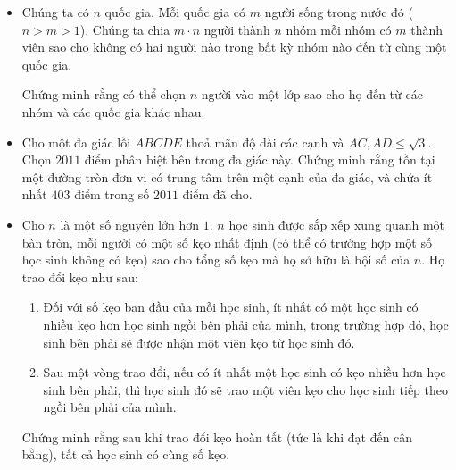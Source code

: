 \documentclass[11pt]{scrartcl}
\begin{document}
\begin{itemize}[label=, leftmargin=0em, itemsep=0.5em]
    \item \begin{btvn}
        Chúng ta có $n$ quốc gia. Mỗi quốc gia có $m$ người sống trong nước đó ($n>m>1$). Chúng ta chia $m \cdot n$ người thành $n$ nhóm mỗi nhóm có $m$ thành viên sao cho không có hai người nào trong bất kỳ nhóm nào đến từ cùng một quốc gia.


        Chứng minh rằng có thể chọn $n$ người vào một lớp sao cho họ đến từ các nhóm và các quốc gia khác nhau.
    \end{btvn}

    \item \begin{btvn}
        Cho một đa giác lồi $ABCDE$ thoả mãn độ dài các cạnh và $AC, AD \leq \sqrt{3}.$ Chọn $2011$ điểm phân biệt bên trong đa giác này. Chứng minh rằng tồn tại một đường tròn đơn vị có trung tâm trên một cạnh của đa giác, và chứa ít nhất $403$ điểm trong số $2011$ điểm đã cho.

    \end{btvn}

    \item \begin{btvn}
        Cho $n$ là một số nguyên lớn hơn $1.$ $n$ học sinh được sắp xếp xung quanh một bàn tròn, mỗi người có một số kẹo nhất định (có thể có trường hợp một số học sinh không có kẹo) sao cho tổng số kẹo mà họ sở hữu là bội số của $n.$ Họ trao đổi kẹo như sau: 
        
        \begin{enumerate}
            \item Đối với số kẹo ban đầu của mỗi học sinh, ít nhất có một học sinh có nhiều kẹo hơn học sinh ngồi bên phải của mình, trong trường hợp đó, học sinh bên phải sẽ được nhận một viên kẹo từ học sinh đó.
            \item Sau một vòng trao đổi, nếu có ít nhất một học sinh có kẹo nhiều hơn học sinh bên phải, thì học sinh đó sẽ trao một viên kẹo cho học sinh tiếp theo ngồi bên phải của mình.
        \end{enumerate}  
        Chứng minh rằng sau khi trao đổi kẹo hoàn tất (tức là khi đạt đến cân bằng), tất cả học sinh có cùng số kẹo.
    \end{btvn}


\end{itemize}
\end{document}
